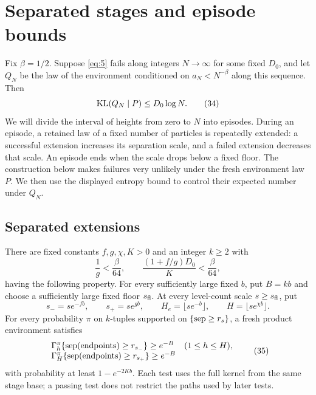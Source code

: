 \section{Separated stages and episode bounds}\label{sec:stages}

Fix \(\beta=1/2\). Suppose \eqref{eq:5} fails along integers
\(N\to\infty\) for some fixed \(D_0\), and let \(Q_N\) be the
law of the environment conditioned on \(a_N<N^{-\beta}\) along this
sequence. Then
\[
 {\rm KL}(Q_N\mid P)\le D_0\log N.
 \tag{34}\label{eq:34}
\]
We will divide the interval of heights from zero to \(N\) into episodes.
During an episode, a retained law of a fixed number of particles is repeatedly extended:
a successful extension increases its separation scale, and a failed
extension decreases that scale. An episode ends when the scale drops below
a fixed floor. The construction below makes failures very unlikely under
the fresh environment law \(P\). We then use the displayed entropy bound
to control their expected number under \(Q_N\).

\subsection{Separated extensions}

\begin{proposition}\label{stage-prop}
There are fixed constants \(f,g,\chi,K>0\) and an integer \(k\ge2\)
with
\[
 \frac1g<\frac{\beta}{64},\qquad
 \frac{(1+f/g)D_0}{K}<\frac{\beta}{64},
\]
having the following property. For every sufficiently large fixed \(b\),
put \(B=kb\) and choose a sufficiently large fixed floor
\(s_{\rm fl}\). At every level-count scale \(s\ge s_{\rm fl}\), put
\[
 s_-=se^{-fb},\qquad s_+=se^{gb},\qquad
 H_e=\lfloor se^{-b}\rfloor,\qquad H=\lfloor se^{\chi b}\rfloor.
\]
For every probability \(\pi\) on \(k\)-tuples supported on
\(\{{\rm sep}\ge r_s\}\), a fresh product environment satisfies
\[
\begin{array}{ll}
 \Gamma_h^\pi\{{\rm sep}(\text{endpoints})\ge r_{s_-}\}\ge e^{-B}
       &(1\le h\le H),\\
 \Gamma_H^\pi\{{\rm sep}(\text{endpoints})\ge r_{s_+}\}\ge e^{-B}
\end{array}
\tag{35}\label{eq:35}
\]
with probability at least \(1-e^{-2Kb}\). Each test uses the full
kernel from the same stage base; a passing test does not restrict the
paths used by later tests.
\end{proposition}

